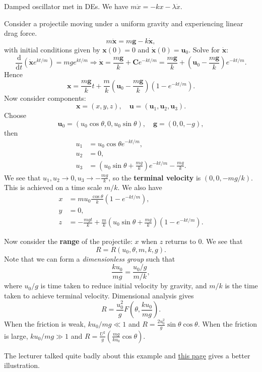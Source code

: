 \begin{example}
    Damped oscillator met in DEs. We have $ m \ddot{x} = -kx - \lambda \dot{x} $.
\end{example}
\begin{example}
    Consider a projectile moving under a uniform gravity and experiencing linear drag force.
    \[
        m \ddot{\mathbf{x}} = m\mathbf{g} -k \dot{\mathbf{x}},
    \]
    with initial conditions given by $ \mathbf{x}(0) = 0 $ and $ \dot{\mathbf{x}}(0)=\mathbf{u}_0 $. Solve for $ \dot{\mathbf{x}} $:
    \[
        \frac{\mathrm{d}}{\mathrm{d}t} (\dot{\mathbf{x}} e^{kt/m})=mge^{kt/m} \Longrightarrow \dot{\mathbf{x}} = \frac{m\mathbf{g}}{k}+\mathbf{C} e^{-kt/m} = \frac{m\mathbf{g}}{k}+\left( \mathbf{u}_0-\frac{m\mathbf{g}}{k} \right)e^{-kt/m}.
    \]
    Hence 
    \[
        \mathbf{x} = \frac{m\mathbf{g}}{k}t+\frac{m}{k}\left( \mathbf{u}_0-\frac{m\mathbf{g}}{k} \right)(1-e^{-kt/m}).
    \]
    Now consider components:
    \[
        \mathbf{x}=(x,y,z),\quad \mathbf{u}= (\mathbf{u}_1,\mathbf{u}_2,\mathbf{u}_3).
    \]
    Choose
    \[
        \mathbf{u}_0 = (u_0 \cos \theta,0,u_0 \sin \theta),\quad \mathbf{g} = (0,0,-g),
    \]
    then
    \begin{align*}
        u_1 &= u_0 \cos \theta e^{-kt/m},\\ 
        u_2 &= 0,\\
        u_3 &= \left( u_0\sin \theta+\frac{mg}{k} \right)e^{-kt/m}-\frac{mg}{k}.
    \end{align*}
    We see that $ u_1,u_2\to 0,u_3\to -\frac{mg}{k} $, so the \textbf{terminal velocity} is $ (0,0,-mg/k) $. This is achieved on a time scale $ m/k $. We also have 
    \begin{align*}
        x&= m u_0\frac{\cos \theta}{k}(1-e^{-kt/m}),\\ 
        y&= 0,\\ 
        z&= -\frac{mgt}{k}+\frac{m}{k}\left( u_0 \sin \theta+\frac{mg}{k} \right)(1-e^{-kt/m}).
    \end{align*}

    Now consider the \textbf{range} of the projectile: $x$ when $z$ returns to 0. We see that 
    \[
        R = R(u_0,\theta,m,k,g).
    \]
    Note that we can form a \textit{dimensionless group} such that 
    \[
        \frac{ku_0}{mg} = \frac{u_0/g}{m/k},
    \]
    where $u_0/g$ is time taken to reduce initial velocity by gravity, and $m/k$ is the time taken to achieve terminal velocity. Dimensional analysis gives 
    \[
        R = \frac{u_0^2}{g}F\left( \theta,\frac{ku_0}{mg} \right).
    \] 
    When the friction is weak, $ ku_0/mg\ll 1 $ and $ R = \frac{2u_0^2}{g}\sin \theta \cos \theta  $. When the friction is large, $ ku_0/mg\gg 1 $ and $ R=\frac{U^2}{g}\left( \frac{mg}{ku_0}\cos \theta \right) $.
\end{example}
The lecturer talked quite badly about this example and \href{http://www.damtp.cam.ac.uk/user/tong/relativity/two.pdf\#page=27}{this page} gives a better illustration.